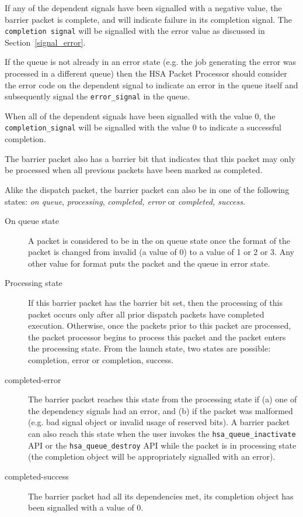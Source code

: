 

If any of the dependent signals have been signalled with a negative
value, the barrier packet is complete, and will indicate failure in
its completion signal. The \texttt{completion signal} will be
signalled with the error value as discussed in
Section~\ref{signal_error}.

If the queue is not already in an error state (e.g. the job
generating the error was processed in a different queue) then the
HSA Packet Processor should consider the error code on the dependent
signal to indicate an error in the queue itself and subsequently
signal the \texttt{error\_signal} in the queue.

When all of the dependent signals have been signalled with the value
0, the \texttt{completion\_signal} will be signalled with the value 0 to
indicate a successful completion.

The barrier packet also has a barrier bit that indicates that this
packet may only be processed when all previous packets have been
marked as completed.

Alike the dispatch packet, the barrier packet can also be in one of
the following states: \emph{on queue}, \emph{processing},
\emph{completed, error} or \emph{completed, success}.

\begin{description}

\item[On queue state] A packet is considered to be in the on queue
state once the format of the packet is changed from invalid (a value
of 0) to a value of 1 or 2 or 3. Any other value for format puts the
packet and the queue in error state.

\item[Processing state] If this barrier packet has the barrier bit set,
then the processing of this packet occurs only after all prior
dispatch packets have completed execution.  Otherwise, once the
packets prior to this packet are processed, the packet processor
begins to process this packet and the packet enters the processing
state.  From the launch state, two states are possible: completion,
error or completion, success.

\item[completed-error] The barrier packet reaches this state from
the processing state if (a) one of the dependency signals had an
error, and (b) if the packet was malformed (e.g. bad signal object
or invalid usage of reserved bits). A barrier packet can also reach
this state when the user invokes the \texttt{hsa\_queue\_inactivate}
API or the \texttt{hsa\_queue\_destroy} API while the packet is in
processing state (the completion object will be appropriately
signalled with an error).

\item[completed-success] The barrier packet had all its dependencies
met, its completion object has been signalled with a value of 0.

\end{description}

